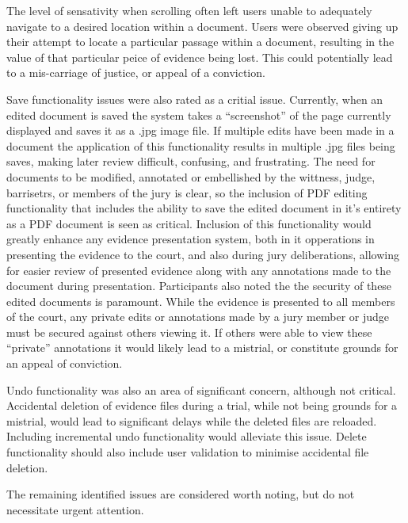 The level of sensativity when scrolling often left users unable to adequately navigate to a desired location within a document. Users were observed giving up their attempt to locate a particular passage within a document, resulting in the value of that particular peice of evidence being lost. This could potentially lead to a mis-carriage of justice, or appeal of a conviction.

Save functionality issues were also rated as a critial issue. Currently, when an edited document is saved the system takes a ``screenshot'' of the page currently displayed and saves it as a .jpg image file. If multiple edits have been made in a document the application of this functionality results in multiple .jpg files being saves, making later review difficult, confusing, and frustrating. The need for documents to be modified, annotated or embellished by the wittness, judge, barrisetrs, or members of the jury is clear, so the inclusion of PDF editing functionality that includes the ability to save the edited document in it's entirety as a PDF document is seen as critical. Inclusion of this functionality would greatly enhance any evidence presentation system, both in it opperations in presenting the evidence to the court, and also during jury deliberations, allowing for easier review of presented evidence along with any annotations made to the document during presentation. Participants also noted the the security of these edited documents is paramount. While the evidence is presented to all members of the court, any private edits or annotations made by a jury member or judge must be secured against others viewing it. If others were able to view these ``private'' annotations it would likely lead to a mistrial, or constitute grounds for an appeal of conviction.

Undo functionality was also an area of significant concern, although not critical. Accidental deletion of evidence files during a trial, while not being grounds for a mistrial, would lead to significant delays while the deleted files are reloaded. Including incremental undo functionality would alleviate this issue. Delete functionality should also include user validation to minimise accidental file deletion.

The remaining identified issues are considered worth noting, but do not necessitate urgent attention. 









